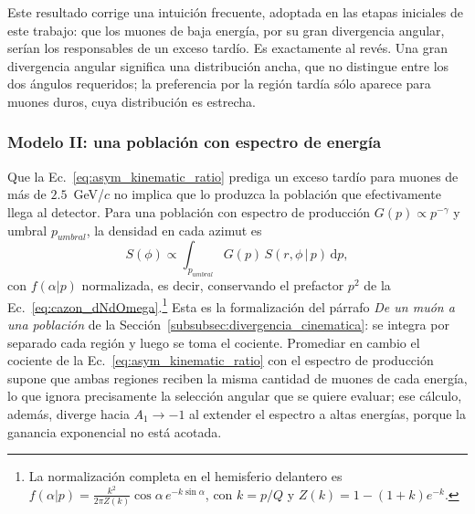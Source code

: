 Este resultado corrige una intuición frecuente, adoptada en las etapas iniciales de este trabajo: que los muones de baja energía, por su gran divergencia angular, serían los responsables de un exceso tardío. Es exactamente al revés. Una gran divergencia angular significa una distribución ancha, que no distingue entre los dos ángulos requeridos; la preferencia por la región tardía sólo aparece para muones duros, cuya distribución es estrecha.

\subsubsection{Modelo II: una población con espectro de energía}
\label{subsubsec:toy_espectro}

Que la Ec.~\ref{eq:asym_kinematic_ratio} prediga un exceso tardío para muones de más de $2.5$~GeV/$c$ no implica que lo produzca la población que efectivamente llega al detector. Para una población con espectro de producción $G(p)\propto p^{-\gamma}$ y umbral $p_{umbral}$, la densidad en cada azimut es
\begin{equation}
	S(\phi) \propto \int_{p_{umbral}} G(p)\,S(r,\phi\,|\,p)\,\mathrm{d}p ,
	\label{eq:poblacion}
\end{equation}
con $f(\alpha|p)$ normalizada, es decir, conservando el prefactor $p^2$ de la Ec.~\ref{eq:cazon_dNdOmega}.\footnote{La normalización completa en el hemisferio delantero es $f(\alpha|p) = \frac{k^2}{2\pi Z(k)}\cos\alpha\,e^{-k\sin\alpha}$, con $k=p/Q$ y $Z(k) = 1-(1+k)e^{-k}$.} Esta es la formalización del párrafo \textit{De un muón a una población} de la Sección~\ref{subsubsec:divergencia_cinematica}: se integra por separado cada región y luego se toma el cociente. Promediar en cambio el cociente de la Ec.~\ref{eq:asym_kinematic_ratio} con el espectro de producción supone que ambas regiones reciben la misma cantidad de muones de cada energía, lo que ignora precisamente la selección angular que se quiere evaluar; ese cálculo, además, diverge hacia $A_1\to-1$ al extender el espectro a altas energías, porque la ganancia exponencial no está acotada.

